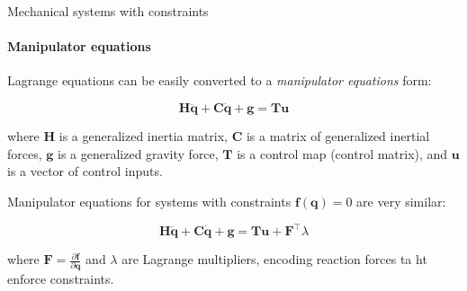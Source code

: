\documentclass{beamer}
\begin{document}
\begin{frame}{Mechanical systems with constraints}
\framesubtitle{Manipulator equations}
\begin{flushleft}

Lagrange equations can be easily converted to a \emph{manipulator equations} form:

\begin{equation}
\label{eq:manipulator}
    \mathbf{H}\ddot{\mathbf{q}} + \mathbf{C}\dot{\mathbf{q}} + \mathbf{g} = \mathbf{T}\mathbf{u}
\end{equation}

where $\mathbf{H}$ is a generalized inertia matrix, $\mathbf{C}$ is a matrix of generalized inertial forces, $\mathbf{g}$ is a generalized gravity force, $\mathbf{T}$ is a control map (control matrix), and $\mathbf{u}$ is a vector of control inputs.
 
\bigskip

Manipulator equations for systems with constraints $\mathbf{f}(\mathbf{q}) = 0$ are very similar:
 
\begin{equation}
\label{eq:manipulator:constrained}
    \mathbf{H}\ddot{\mathbf{q}} + \mathbf{C}\dot{\mathbf{q}} + \mathbf{g} = \mathbf{T}\mathbf{u} + \mathbf{F}^\top \lambda
\end{equation}

where $\mathbf{F} = \frac{\partial \mathbf{f}}{\partial \mathbf{q}}$ and $\lambda$ are Lagrange multipliers, encoding reaction forces ta ht enforce constraints.

\end{flushleft}
\end{frame}
\end{document}
